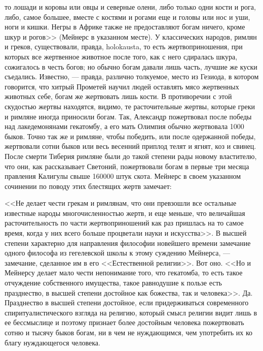 \documentclass[12pt]{article}
\begin{document}
то лошади и коровы или овцы и северные олени, либо только одни кости и рога, либо, самое большее, вместе с костями и рогами еще и головы или нос и уши, ноги и кишки. Негры в Африке также не предоставляют богам ничего, кроме шкур и рогов>> (Мейнерс в указанном месте). У классических народов, римлян и греков, существовали, правда, holokausta, то есть жертвоприношения, при которых все жертвенное животное после того, как с него сдиралась шкура, сожигалось в честь богов; но обычно богам давали лишь часть, лучшие же куски съедались. Известно, --- правда, различно толкуемое, место из Гезиода, в котором говорится, что хитрый Прометей научил людей оставлять мясо жертвенных животных себе, богам же жертвовать лишь кости. В противоречии с этой скудостью жертвы находятся, видимо, те расточительные жертвы, которые греки и римляне иногда приносили богам. Так, Александр пожертвовал после победы над лакедемонянами гекатомбу, а его мать Олимпия обычно жертвовала 1000 быков. Точно так же и римляне, чтобы победить, или после одержанной победы, жертвовали сотни быков или весь весенний приплод телят и ягнят, коз и свинец. После смерти Тиберия римляне были до такой степени рады новому властителю, что они, как рассказывает Светоний, пожертвовали богам в первые три месяца правления Калигулы свыше 160000 штук скота. Мейнерс в своем указанном сочинении по поводу этих блестящих жертв замечает: 

<<Не делает чести грекам и римлянам, что они превзошли все остальные известные народы многочисленностью жертв, и еще меньше, что величайшая расточительность по части жертвоприношений как раз пришлась на то самое время, когда у них всего больше процветали науки и искусства>>. В высшей степени характерно для направления философии новейшего времени замечание одного философа из гегелевской школы к этому суждению Мейнерса, --- замечание, сделанное им в его <<Естественной религии>>. Вот оно. <<Но и Мейнерсу делает мало чести непонимание того, что гекатомба, то есть такое отчуждение собственного имущества, такое равнодушие к пользе есть празднество, в высшей степени достойное как божества, так и человека>>. Да. Празднество в высшей степени достойное, если придерживаться современного спиритуалистического взгляда на религию, который смысл религии видит лишь в ее бессмыслице и поэтому признает более достойным человека пожертвовать сотню и тысячу быков богам, ни в чем не нуждающимся, чем употребить их ко благу нуждающегося человека. 
\end{document}
